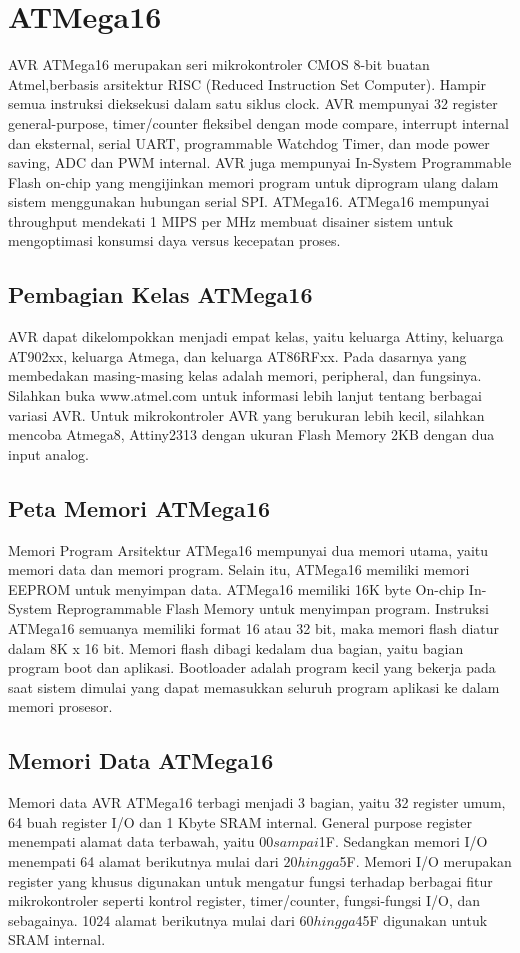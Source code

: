 \section{ATMega16}
		AVR ATMega16 merupakan seri mikrokontroler CMOS 8-bit buatan Atmel,berbasis arsitektur RISC (Reduced Instruction Set Computer). Hampir semua instruksi dieksekusi dalam satu siklus clock. AVR mempunyai 32 register general-purpose, timer/counter fleksibel dengan mode compare, interrupt internal dan eksternal, serial UART, programmable Watchdog Timer, dan mode power saving, ADC dan PWM internal. AVR juga mempunyai In-System Programmable Flash on-chip yang mengijinkan memori program untuk diprogram ulang dalam sistem menggunakan hubungan serial SPI. ATMega16. ATMega16 mempunyai throughput mendekati 1 MIPS per MHz membuat disainer sistem untuk mengoptimasi konsumsi daya versus kecepatan proses.
	\subsection{Pembagian Kelas ATMega16}
		AVR dapat dikelompokkan menjadi empat kelas, yaitu keluarga Attiny, keluarga AT902xx, keluarga Atmega, dan keluarga AT86RFxx. Pada dasarnya yang membedakan masing-masing kelas adalah memori, peripheral, dan fungsinya. Silahkan buka www.atmel.com untuk informasi lebih lanjut tentang berbagai variasi AVR. Untuk mikrokontroler AVR yang berukuran lebih kecil, silahkan mencoba Atmega8, Attiny2313 dengan ukuran Flash Memory 2KB dengan dua input analog.
	\subsection{Peta Memori ATMega16}
		Memori Program    Arsitektur ATMega16 mempunyai dua memori utama, yaitu memori data dan memori program.  Selain itu, ATMega16 memiliki memori EEPROM untuk menyimpan data.  ATMega16 memiliki 16K byte On-chip In-System Reprogrammable Flash Memory untuk menyimpan program.  Instruksi ATMega16 semuanya memiliki format 16 atau 32 bit, maka memori flash diatur dalam 8K x 16 bit.  Memori flash dibagi kedalam dua bagian, yaitu bagian program boot dan aplikasi. Bootloader adalah program kecil yang bekerja pada saat sistem dimulai yang dapat memasukkan seluruh program aplikasi ke dalam memori prosesor.
	\subsection{Memori Data ATMega16}
		Memori data AVR ATMega16 terbagi menjadi 3 bagian, yaitu 32 register umum, 64 buah register I/O dan 1 Kbyte SRAM internal.  General purpose register menempati alamat data terbawah, yaitu $00 sampai $1F.  Sedangkan memori I/O menempati 64 alamat berikutnya mulai dari $20 hingga $5F.  Memori I/O merupakan register yang khusus digunakan untuk mengatur fungsi terhadap berbagai fitur mikrokontroler seperti kontrol register, timer/counter, fungsi-fungsi I/O, dan sebagainya.  1024 alamat berikutnya mulai dari $60 hingga $45F digunakan untuk SRAM internal.
